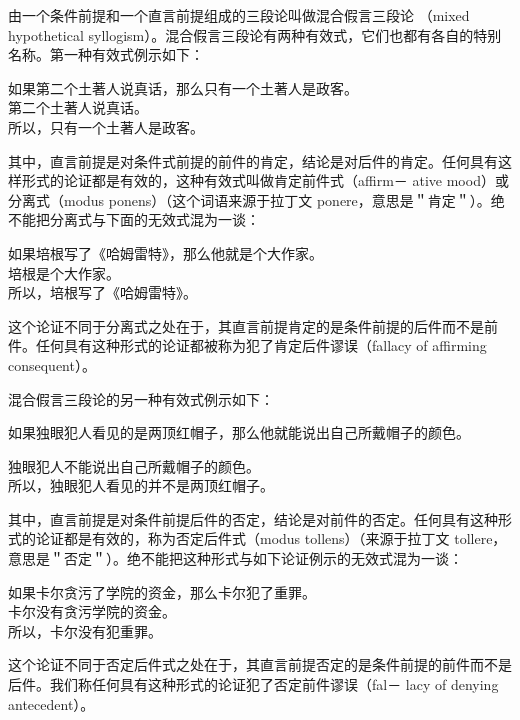 由一个条件前提和一个直言前提组成的三段论叫做混合假言三段论 （mixed hypothetical syllogism）。混合假言三段论有两种有效式，它们也都有各自的特别名称。第一种有效式例示如下：

如果第二个土著人说真话，那么只有一个土著人是政客。\\
第二个土著人说真话。\\
所以，只有一个土著人是政客。

其中，直言前提是对条件式前提的前件的肯定，结论是对后件的肯定。任何具有这样形式的论证都是有效的，这种有效式叫做肯定前件式（affirm－ ative mood）或分离式（modus ponens）（这个词语来源于拉丁文 ponere，意思是＂肯定＂）。绝不能把分离式与下面的无效式混为一谈：

\begin{displayquote}
如果培根写了《哈姆雷特》，那么他就是个大作家。\\
培根是个大作家。\\
所以，培根写了《哈姆雷特》。
\end{displayquote}

这个论证不同于分离式之处在于，其直言前提肯定的是条件前提的后件而不是前件。任何具有这种形式的论证都被称为犯了肯定后件谬误（fallacy of affirming consequent）。

混合假言三段论的另一种有效式例示如下：

\begin{displayquote}
如果独眼犯人看见的是两顶红帽子，那么他就能说出自己所戴帽子的颜色。
\end{displayquote}

\begin{displayquote}
独眼犯人不能说出自己所戴帽子的颜色。\\
所以，独眼犯人看见的并不是两顶红帽子。
\end{displayquote}

其中，直言前提是对条件前提后件的否定，结论是对前件的否定。任何具有这种形式的论证都是有效的，称为否定后件式（modus tollens）（来源于拉丁文 tollere，意思是＂否定＂）。绝不能把这种形式与如下论证例示的无效式混为一谈：

\begin{displayquote}
如果卡尔贪污了学院的资金，那么卡尔犯了重罪。\\
卡尔没有贪污学院的资金。\\
所以，卡尔没有犯重罪。
\end{displayquote}

这个论证不同于否定后件式之处在于，其直言前提否定的是条件前提的前件而不是后件。我们称任何具有这种形式的论证犯了否定前件谬误（fal－ lacy of denying antecedent）。

